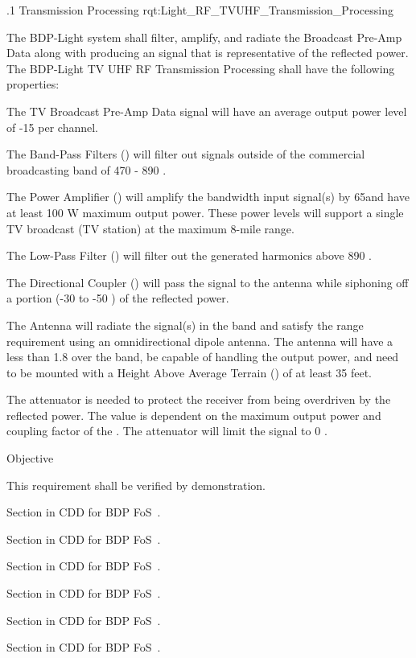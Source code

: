 
\ONERQMTV
{\RqtNumberBase.1}
{\ThisSubSegment Transmission Processing}
{rqt:Light_RF_TVUHF_Transmission_Processing}
{
The BDP-Light system shall filter, amplify, and radiate the \TVUHF \RF Broadcast Pre-Amp Data along with producing an \RF signal that is representative of the reflected \RF power. The BDP-Light TV UHF RF Transmission Processing shall have the following properties:
\begin{my_enumerate}
	\item The TV \RF Broadcast Pre-Amp Data signal will have an average output power level of -15 \dBm per \RF channel.
	\item The Band-Pass Filters (\BPF) will filter out signals outside of the commercial \FM broadcasting band of 470 - 890 \MHz.
	\item The \RF Power Amplifier (\PA) will amplify the \TVUHF bandwidth input signal(s) by 65\dB and have at least 100 W maximum output power. These power levels will support a single TV broadcast (TV station) at the maximum 8-mile range.
	\item The Low-Pass Filter (\LPF) will filter out the generated harmonics above 890 \MHz.
	\item The Directional Coupler (\DC) will pass the \RF signal to the antenna while siphoning off a portion (-30 to -50 \dB) of the reflected power.
	\item The Antenna will radiate the \RF signal(s) in the \TVUHF band and satisfy the range requirement using an omnidirectional dipole antenna. The antenna will have a \VSWR less than 1.8 over the \TVUHF band, be capable of handling the \PA output power, and need to be mounted with a Height Above Average Terrain (\HAAT) of at least 35 feet.
	\item The attenuator is needed to protect the receiver from being overdriven by the reflected power. The value is dependent on the maximum \PA output power and coupling factor of the \DC. The attenuator will limit the signal to 0 \dBm.
\end{my_enumerate}
}
{
	\item [Phase 1]  Objective
}
{This requirement shall be verified by demonstration.}
{
	\item [5.1.1] Section in CDD for BDP FoS~\cite{ref__BDP_FOS_CDD}.
	\item [5.1.2] Section in CDD for BDP FoS~\cite{ref__BDP_FOS_CDD}.
	\item [5.1.4] Section in CDD for BDP FoS~\cite{ref__BDP_FOS_CDD}.
	\item [5.5.1] Section in CDD for BDP FoS~\cite{ref__BDP_FOS_CDD}.
	\item [5.5.3] Section in CDD for BDP FoS~\cite{ref__BDP_FOS_CDD}.
	\item [5.5.4] Section in CDD for BDP FoS~\cite{ref__BDP_FOS_CDD}.
}
